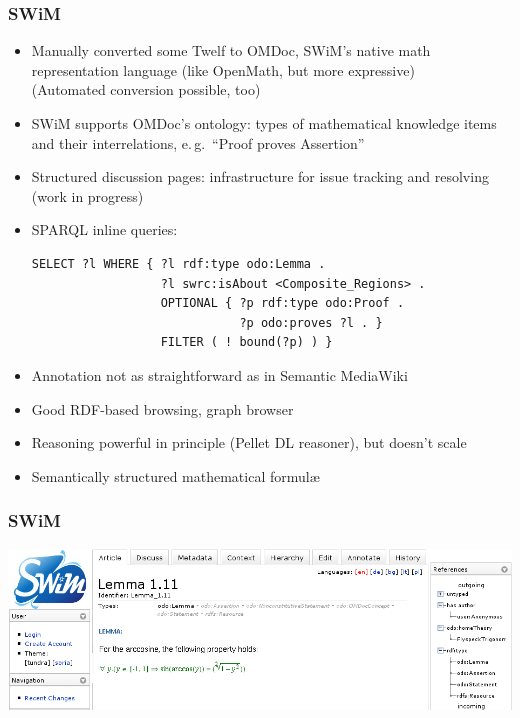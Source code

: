\documentclass[pdftex]{beamer}
\begin{document}
\begin{frame}[fragile]
  \frametitle{SWiM}
  \begin{itemize}
  \item Manually converted some Twelf to OMDoc, SWiM's native math
    representation language (like OpenMath, but more expressive)\\
    (Automated conversion possible, too)
  \item SWiM supports OMDoc's ontology: types of mathematical knowledge items
    and their interrelations, e.\,g.\ ``Proof proves Assertion''
  \item Structured discussion pages: infrastructure for issue tracking and
    resolving (work in progress)
  \item SPARQL inline queries:
\begin{lstlisting}
SELECT ?l WHERE { ?l rdf:type odo:Lemma .
                  ?l swrc:isAbout <Composite_Regions> .
                  OPTIONAL { ?p rdf:type odo:Proof .
                             ?p odo:proves ?l . }
                  FILTER ( ! bound(?p) ) }
\end{lstlisting}
    \item Annotation not as straightforward as in Semantic MediaWiki
    \item Good RDF-based browsing, graph browser
    \item Reasoning powerful in principle (Pellet DL reasoner), but doesn't scale
    \item Semantically structured mathematical formulæ
  \end{itemize}
\end{frame}

\begin{frame}
  \frametitle{SWiM}
  \includegraphics[width=\textwidth]{images/swim-lemma}

\end{frame}
\end{document}
